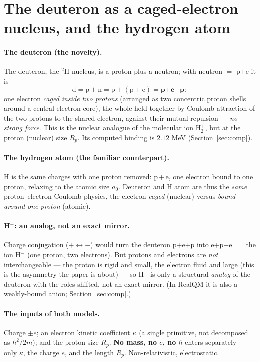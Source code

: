 \documentclass[11pt]{article}
\begin{document}
\section{The deuteron as a caged-electron nucleus, and the hydrogen atom}\label{sec:pair}
\paragraph{The deuteron (the novelty).} The deuteron, the $^2$H nucleus, is a proton plus a neutron; with
neutron $=$ p$+$e it is
\[ \text{d}=\text{p}+\text{n}=\text{p}+(\text{p}+\text{e})=\textbf{p+e+p}: \]
one electron \emph{caged inside two protons} (arranged as two concentric proton shells around a central
electron core), the whole held together by Coulomb attraction of the two protons to the shared electron,
against their mutual repulsion --- \emph{no strong force}. This is the nuclear analogue of the molecular ion
H$_2^+$, but at the proton (nuclear) size $R_p$. Its computed binding is $2.12$ MeV
(Section~\ref{sec:comp}).

\paragraph{The hydrogen atom (the familiar counterpart).} H is the same charges with one proton removed:
p\,+\,e, one electron bound to one proton, relaxing to the atomic size $a_0$. Deuteron and H atom are thus
the \emph{same} proton--electron Coulomb physics, the electron \emph{caged} (nuclear) versus \emph{bound
around one proton} (atomic).

\paragraph{H$^-$: an analog, not an exact mirror.} Charge conjugation ($+\leftrightarrow-$) would turn the
deuteron p$+$e$+$p into e$+$p$+$e $=$ the ion H$^-$ (one proton, two electrons). But protons and electrons
are \emph{not} interchangeable --- the proton is rigid and small, the electron fluid and large (this is the
asymmetry the paper is about) --- so H$^-$ is only a structural \emph{analog} of the deuteron with the roles
shifted, not an exact mirror. (In RealQM it is also a weakly-bound anion; Section~\ref{sec:comp}.)

\paragraph{The inputs of both models.} Charge $\pm e$; an electron kinetic coefficient $\kappa$ (a single
primitive, not decomposed as $\hbar^2/2m$); and the proton size $R_p$. \textbf{No mass, no $c$, no $\hbar$}
enters separately --- only $\kappa$, the charge $e$, and the length $R_p$. Non-relativistic, electrostatic.
\end{document}
